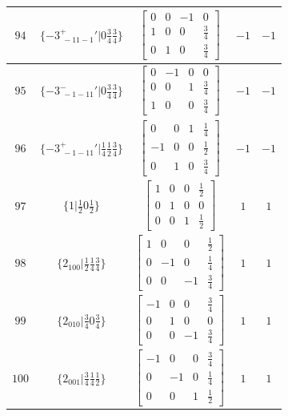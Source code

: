 \documentclass[fleqn,8pt]{jsarticle}
\begin{document}
\begin{longtable}{ccccc}
$ 94 $ & $ \{-3^{+}_{\,\,-11-1}{}'|0 \frac{3}{4} \frac{3}{4}\} $ & $ \begin{bmatrix} 0 & 0 & -1 & 0 \\ 1 & 0 & 0 & \frac{3}{4} \\ 0 & 1 & 0 & \frac{3}{4} \end{bmatrix} $ & $ -1 $ & $ -1 $ \\ \hline
$ 95 $ & $ \{-3^{-}_{\,\,-1-11}{}'|0 \frac{3}{4} \frac{3}{4}\} $ & $ \begin{bmatrix} 0 & -1 & 0 & 0 \\ 0 & 0 & 1 & \frac{3}{4} \\ 1 & 0 & 0 & \frac{3}{4} \end{bmatrix} $ & $ -1 $ & $ -1 $ \\ \hline
$ 96 $ & $ \{-3^{+}_{\,\,-1-11}{}'|\frac{1}{4} \frac{1}{2} \frac{3}{4}\} $ & $ \begin{bmatrix} 0 & 0 & 1 & \frac{1}{4} \\ -1 & 0 & 0 & \frac{1}{2} \\ 0 & 1 & 0 & \frac{3}{4} \end{bmatrix} $ & $ -1 $ & $ -1 $ \\ \hline
$ 97 $ & $ \{1|\frac{1}{2} 0 \frac{1}{2}\} $ & $ \begin{bmatrix} 1 & 0 & 0 & \frac{1}{2} \\ 0 & 1 & 0 & 0 \\ 0 & 0 & 1 & \frac{1}{2} \end{bmatrix} $ & $ 1 $ & $ 1 $ \\ \hline
$ 98 $ & $ \{2{}_{100}|\frac{1}{2} \frac{1}{4} \frac{3}{4}\} $ & $ \begin{bmatrix} 1 & 0 & 0 & \frac{1}{2} \\ 0 & -1 & 0 & \frac{1}{4} \\ 0 & 0 & -1 & \frac{3}{4} \end{bmatrix} $ & $ 1 $ & $ 1 $ \\ \hline
$ 99 $ & $ \{2{}_{010}|\frac{3}{4} 0 \frac{3}{4}\} $ & $ \begin{bmatrix} -1 & 0 & 0 & \frac{3}{4} \\ 0 & 1 & 0 & 0 \\ 0 & 0 & -1 & \frac{3}{4} \end{bmatrix} $ & $ 1 $ & $ 1 $ \\ \hline
$ 100 $ & $ \{2{}_{001}|\frac{3}{4} \frac{1}{4} \frac{1}{2}\} $ & $ \begin{bmatrix} -1 & 0 & 0 & \frac{3}{4} \\ 0 & -1 & 0 & \frac{1}{4} \\ 0 & 0 & 1 & \frac{1}{2} \end{bmatrix} $ & $ 1 $ & $ 1 $ \\ \hline

\end{longtable}
\end{document}
